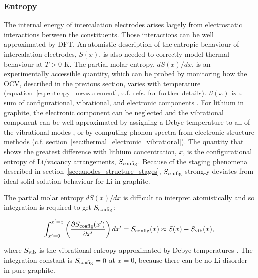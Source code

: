 \documentclass[../main.tex]{subfiles}
\begin{document}
\subsubsection{Entropy}
\label{sec:anodes_entropy}
The internal energy of intercalation electrodes arises largely from electrostatic interactions between the constituents. Those interactions can be well approximated by DFT. An atomistic description of the entropic behaviour of intercalation electrodes, $S(x)$, is also needed to correctly model thermal behaviour at $T>0$ K. The partial molar entropy, $dS(x)/dx$, is an experimentally accessible quantity, which can be probed by monitoring how the OCV, described in the previous section, varies with temperature (equation~\ref{eq:entropy_measurement}, c.f. refs.  for further details). $S(x)$ is a sum of configurational, vibrational, and electronic components \cite{REYNIER2003850,Reynier2004}. For lithium in graphite, the electronic component can be neglected and the vibrational component can be well approximated by assigning a Debye temperature to all of the vibrational modes \cite{REYNIER2003850,Reynier2004}, or by computing phonon spectra from electronic structure methods \cite{hazrati_li_2014,vanderven2018} (c.f. section~\ref{sec:thermal_electronic_vibrational}). The quantity that shows the greatest difference with lithium concentration, $x$, is the configurational entropy of Li/vacancy arrangements, $S_{\rm{config}}$. Because of the staging phenomena described in section~\ref{sec:anodes_structure_stages}, $S_{\rm{config}}$ strongly deviates from ideal solid solution behaviour for Li in graphite.

The partial molar entropy $dS(x)/dx$ is difficult to interpret atomistically and so integration is required to get $S_{\rm{config}}$:

\begin{equation}
    \int_{x'=0}^{x'=x} \left(\frac{{\partial}S_{\rm{config}}(x')}{{\partial}x'}\right)dx' = S_{\rm{config}}(x) \approx S(x) - S_{\rm{vib}}(x),
    \label{eq:entropy_integration}
\end{equation}

where $S_{\rm{vib}}$ is the vibrational entropy approximated by Debye temperatures  \cite{REYNIER2003850,Reynier2004}. The integration constant is $S_{\rm{config}} = 0$ at $x=0$, because there can be no Li disorder in pure graphite. 
\end{document}
